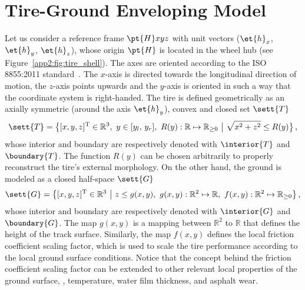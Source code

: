 
\section{Tire-Ground Enveloping Model}
\label{app2:sec:model}

Let us consider a reference frame $\pt{H}xyz$ with unit vectors ($\et{h}_x$, $\et{h}_y$, $\et{h}_z$), whose origin $\pt{H}$ is located in the wheel hub (see Figure~\ref{app2:fig:tire_shell}). The axes are oriented according to the ISO 8855:2011 standard~\cite{iso88552011}. The $x$-axis is directed towards the longitudinal direction of motion, the $z$-axis points upwards and the $y$-axis is oriented in such a way that the coordinate system is right-handed. The tire is defined geometrically as an axially symmetric (around the axis $\et{h}_y$), convex and closed set $\sett{T}$
%
\begin{equation*}
  \sett{T} = \big\{ [x, y, z]^\mathrm{T} \in \mathbb{R}^3, ~ y \in [ y_l, \, y_r ], ~ R(y):\mathbb{R} \mapsto \mathbb{R}_{\geq 0} ~ \big\lvert ~ \sqrt{x^2+z^2} \leq R(y) \big\}  \, \text{,}
\end{equation*}
%
whose interior and boundary are respectively denoted with $\interior{T}$ and $\boundary{T}$. The function $R(y)$ can be chosen arbitrarily to properly reconstruct the tire's external morphology. On the other hand, the ground is modeled as a closed half-space $\sett{G}$
%
\begin{equation*}
  \sett{G} = \big\{ [x, y, z]^\mathrm{T} \in \mathbb{R}^3 ~ \big\lvert ~ z \leq g(x,y), ~ g(x,y): \mathbb{R}^2 \mapsto \mathbb{R}, ~ f(x,y):\mathbb{R}^2 \mapsto \mathbb{R}_{\geq 0}\big\}  \, \text{,}
\end{equation*}
%
whose interior and boundary are respectively denoted with $\interior{G}$ and $\boundary{G}$. The map $g(x,y)$ is a mapping between $\mathbb{R}^2$ to $\mathbb{R}$ that defines the height of the track surface. Similarly, the map $f(x,y)$ defines the local friction coefficient scaling factor, which is used to scale the tire performance according to the local ground surface conditions. Notice that the concept behind the friction coefficient scaling factor can be extended to other relevant local properties of the ground surface, \eg{}, temperature, water film thickness, and asphalt wear.

